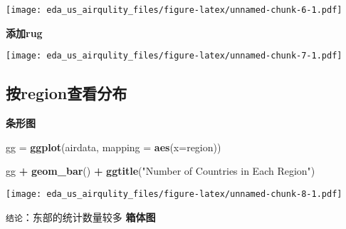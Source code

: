 \documentclass[]{article}
\newenvironment{Shaded}{\begin{snugshade}}{\end{snugshade}}
\newcommand{\KeywordTok}[1]{\textcolor[rgb]{0.13,0.29,0.53}{\textbf{#1}}}
\newcommand{\DataTypeTok}[1]{\textcolor[rgb]{0.13,0.29,0.53}{#1}}
\newcommand{\DecValTok}[1]{\textcolor[rgb]{0.00,0.00,0.81}{#1}}
\newcommand{\FloatTok}[1]{\textcolor[rgb]{0.00,0.00,0.81}{#1}}
\newcommand{\StringTok}[1]{\textcolor[rgb]{0.31,0.60,0.02}{#1}}
\newcommand{\OperatorTok}[1]{\textcolor[rgb]{0.81,0.36,0.00}{\textbf{#1}}}
\newcommand{\NormalTok}[1]{#1}
\begin{document}
\texttt{[image: eda\_us\_airqulity\_files/figure-latex/unnamed-chunk-6-1.pdf]}

\textbf{添加rug}

\begin{Shaded}
\end{Shaded}

\texttt{[image: eda\_us\_airqulity\_files/figure-latex/unnamed-chunk-7-1.pdf]}

\subsection{按region查看分布}\label{region}

\textbf{条形图}

\begin{Shaded}
\begin{Highlighting}[]
\NormalTok{gg =}\StringTok{ }\KeywordTok{ggplot}\NormalTok{(airdata, }\DataTypeTok{mapping =} \KeywordTok{aes}\NormalTok{(}\DataTypeTok{x=}\NormalTok{region))}

\NormalTok{gg }\OperatorTok{+}\StringTok{ }\KeywordTok{geom_bar}\NormalTok{() }\OperatorTok{+}\StringTok{ }\KeywordTok{ggtitle}\NormalTok{(}\StringTok{"Number of Countries in Each Region"}\NormalTok{)}
\end{Highlighting}
\end{Shaded}

\texttt{[image: eda\_us\_airqulity\_files/figure-latex/unnamed-chunk-8-1.pdf]}

\texttt{结论}：东部的统计数量较多 \textbf{箱体图}

\begin{Shaded}
\end{Shaded}
\end{document}
